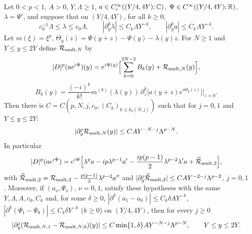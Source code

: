 \begin{lemma}
  \label{lem:appendix_oscillatory_multiplier}
  Let $0<p<1$, $A>0$, $Y,\Lambda\ge1$, $a\in C_c^\infty((Y/4,4Y);\mathbb{C})$, $\Psi\in C^\infty((Y/4,4Y);\mathbb{R})$, $\lambda=\Psi'$, and suppose that on $(Y/4,4Y)$, for all $k\ge0$,
  \[
    c_0^{-1}\Lambda\le\lambda\le c_0\Lambda,\qquad|\partial_y^k\lambda|\le C_k\Lambda Y^{-k},\qquad|\partial_y^ka|\le C_kAY^{-k}.
  \]
  Let $m(\xi)=\xi^p$, $\Theta_y(z)=\Psi(y+z)-\Psi(y)-\lambda(y)z$. For $N\ge1$ and $Y\le y\le2Y$ define $\mathcal{R}_{\textup{mult},N}$ by
  \begin{equation}\label{eqn:appendix_oscillatory_multiplier_expansion}
    |D|^p(ae^{i\Psi})(y)=e^{i\Psi(y)}\Bigl[\sum_{k=0}^{2N-2}B_k(y)+\mathcal{R}_{\textup{mult},N}(y)\Bigr],
  \end{equation}
  \begin{equation}\label{eqn:appendix_oscillatory_multiplier_coefficients}
    B_k(y)=\frac{(-i)^k}{k!}m^{(k)}(\lambda(y))\,\partial_z^k\bigl[a(y+z)e^{i\Theta_y(z)}\bigr]\big|_{z=0}.
  \end{equation}
  Then there is $C=C(p,N,j,c_0,(C_k)_{k\le k_0(N,j)})$ such that for $j=0,1$ and $Y\le y\le2Y$:
  \begin{equation}\label{eqn:appendix_oscillatory_multiplier_amplitude_remainder}
    |\partial_y^j\mathcal{R}_{\textup{mult},N}(y)|\le CAY^{-N-j}\Lambda^{p-N}.
  \end{equation}
  In particular
  \begin{equation}\label{eqn:appendix_oscillatory_multiplier_two_term_expansion}
    |D|^p(ae^{i\Psi})=e^{i\Psi}\Bigl[\lambda^pa-ip\lambda^{p-1}a'-\frac{ip(p-1)}2\lambda^{p-2}\lambda'a+\widetilde{\mathcal{R}}_{\textup{mult},2}\Bigr],
  \end{equation}
  with $\widetilde{\mathcal{R}}_{\textup{mult},2}=\mathcal{R}_{\textup{mult},2}-\frac{p(p-1)}2\lambda^{p-2}a''$ and $|\partial_y^j\widetilde{\mathcal{R}}_{\textup{mult},2}|\le CAY^{-2-j}\Lambda^{p-2}$, $j=0,1$.
  Moreover, if $(a_\nu,\Psi_\nu)$, $\nu=0,1$, satisfy these hypotheses with the same $Y,\Lambda,A,c_0,C_k$ and, for some $\delta\ge0$,
  $|\partial^k(a_1-a_0)|\le C_k\delta AY^{-k}$, $|\partial^k(\Psi_1-\Psi_0)|\le C_k\delta Y^{-k}$ ($k\ge0$) on $(Y/4,4Y)$, then for every $j\ge0$
  \begin{equation}\label{eqn:appendix_oscillatory_multiplier_amplitude_difference}
    |\partial_y^j(\mathcal{R}_{\textup{mult},N,1}-\mathcal{R}_{\textup{mult},N,0})(y)|\le C\min\{1,\delta\}AY^{-N-j}\Lambda^{p-N},\qquad Y\le y\le2Y .
  \end{equation}
\end{lemma}
